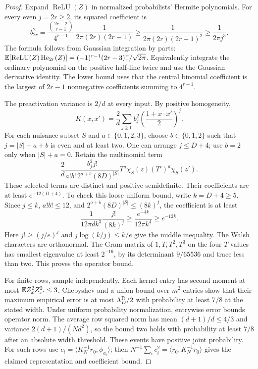 \begin{proof}
Expand $\operatorname{ReLU}(Z)$ in normalized probabilists' Hermite polynomials. For every even $j=2r\ge2$, its squared coefficient is
\[
 b_{2r}^2=
 \frac{\binom{2r-2}{r-1}}{4^{r-1}}\,
       \frac1{2\pi(2r)(2r-1)}
 \ge\frac1{2\pi(2r)(2r-1)^2}
 \ge\frac1{2\pi j^3}.
\]
The formula follows from Gaussian integration by parts:
$\mathbb E[\operatorname{ReLU}(Z)\operatorname{He}_{2r}(Z)]
=(-1)^{r-1}(2r-3)!!/\sqrt{2\pi}$.
Equivalently integrate the ordinary polynomial on the positive half-line twice and use the Gaussian derivative identity. The lower bound uses that the central binomial coefficient is the largest of $2r-1$ nonnegative coefficients summing to $4^{r-1}$.

The preactivation variance is $2/d$ at every input. By positive homogeneity,
\[
 K(x,x')=\frac2d\sum_{j\ge0}b_j^2
           \left(\frac{1+x\cdot x'}2\right)^j.
\]
For each nuisance subset $S$ and $a\in\{0,1,2,3\}$, choose $b\in\{0,1,2\}$ such that $j=|S|+a+b$ is even and at least two. One can arrange $j\le D+4$; use $b=2$ only when $|S|+a=0$. Retain the multinomial term
\[
 \frac2d\frac{b_j^2j!}{a!b!\,2^{a+b}(8D)^{|S|}}
       T^a\chi_S(z)(T')^a\chi_S(z').
\]
These selected terms are distinct and positive semidefinite. Their coefficients are at least $e^{-12(D+4)}$. To check this loose uniform bound, write $k=D+4\ge5$. Since $j\le k$, $a!b!\le12$, and $2^{a+b}(8D)^{|S|}\le(8k)^j$, the coefficient is at least
\[
 \frac1{12\pi d k^3}\frac{j!}{(8k)^j}
 \ge \frac{e^{-4k}}{12\pi k^4}\ge e^{-12k}.
\]
Here $j!\ge(j/e)^j$ and $j\log(k/j)\le k/e$ give the middle inequality. 
The Walsh characters are orthonormal. The Gram matrix of $1,T,T^2,T^3$ on the four $T$ values has smallest eigenvalue at least $2^{-16}$, by its determinant $9/65536$ and trace less than two. This proves the operator bound.

For finite rows, sample independently. Each kernel entry has second moment at most $\mathbb E Z_x^2Z_{x'}^2\le3$. Chebyshev and a union bound over $m^2$ entries show that their maximum empirical error is at most $\Lambda_D^{\rm R}/2$ with probability at least $7/8$ at the stated width. Under uniform probability normalization, entrywise error bounds operator norm. The average row squared norm has mean $(d+1)/d\le4/3$ and variance $2(d+1)/(Nd^2)$, so the bound two holds with probability at least $7/8$ after an absolute width threshold. These events have positive joint probability. For such rows use
$c_i=\langle K_N^{-1}r_0,\phi_{a_i}\rangle$; then
$N^{-1}\sum_i c_i^2=\langle r_0,K_N^{-1}r_0\rangle$ gives the claimed representation and coefficient bound.
\end{proof}

